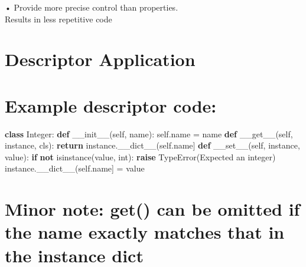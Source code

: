 \documentclass[
  letterpaper,
  DIV=11,
  numbers=noendperiod]{scrreprt}
\newenvironment{Shaded}{\begin{snugshade}}{\end{snugshade}}
\newcommand{\BuiltInTok}[1]{\textcolor[rgb]{0.00,0.23,0.31}{#1}}
\newcommand{\ControlFlowTok}[1]{\textcolor[rgb]{0.00,0.23,0.31}{\textbf{#1}}}
\newcommand{\FunctionTok}[1]{\textcolor[rgb]{0.28,0.35,0.67}{#1}}
\newcommand{\KeywordTok}[1]{\textcolor[rgb]{0.00,0.23,0.31}{\textbf{#1}}}
\newcommand{\NormalTok}[1]{\textcolor[rgb]{0.00,0.23,0.31}{#1}}
\newcommand{\OperatorTok}[1]{\textcolor[rgb]{0.37,0.37,0.37}{#1}}
\newcommand{\PreprocessorTok}[1]{\textcolor[rgb]{0.68,0.00,0.00}{#1}}
\newcommand{\StringTok}[1]{\textcolor[rgb]{0.13,0.47,0.30}{#1}}
\newcommand{\VariableTok}[1]{\textcolor[rgb]{0.07,0.07,0.07}{#1}}
\begin{document}
• Provide more precise control than properties.\\
Results in less repetitive code


\chapter{Descriptor Application}\label{descriptor-application-1}


\chapter{Example descriptor code:}\label{example-descriptor-code}

\begin{Shaded}
\begin{Highlighting}[]
\KeywordTok{class}\NormalTok{ Integer: }\KeywordTok{def} \FunctionTok{\_\_init\_\_}\NormalTok{(}\VariableTok{self}\NormalTok{, name): }\VariableTok{self}\NormalTok{.name }\OperatorTok{=}\NormalTok{ name }\KeywordTok{def} \FunctionTok{\_\_get\_\_}\NormalTok{(}\VariableTok{self}\NormalTok{, instance, cls): }\ControlFlowTok{return}\NormalTok{ instance.\_\_dict\_\_(}\VariableTok{self}\NormalTok{.name] }\KeywordTok{def} \FunctionTok{\_\_set\_\_}\NormalTok{(}\VariableTok{self}\NormalTok{, instance, value): }\ControlFlowTok{if} \KeywordTok{not} \BuiltInTok{isinstance}\NormalTok{(value, }\BuiltInTok{int}\NormalTok{): }\ControlFlowTok{raise} \PreprocessorTok{TypeError}\NormalTok{(}\StringTok{\textquotesingle{}Expected an integer\textquotesingle{}}\NormalTok{) instance.\_\_dict\_\_(}\VariableTok{self}\NormalTok{.name] }\OperatorTok{=}\NormalTok{ value }
\end{Highlighting}
\end{Shaded}


\chapter{\texorpdfstring{Minor note: \textbf{get}() can be omitted if
the name exactly matches that in the instance
dict}{Minor note: get() can be omitted if the name exactly matches that in the instance dict}}\label{minor-note-get-can-be-omitted-if-the-name-exactly-matches-that-in-the-instance-dict}

\end{document}
